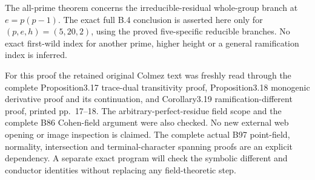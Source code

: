 \begin{remark}
\label{rem:B-RD98-scope}
The all-prime theorem concerns the irreducible-residual
whole-group branch at $e=p(p-1)$. The exact full B.4 conclusion
is asserted here only for $(p,e,h)=(5,20,2)$, using the proved
five-specific reducible branches. No exact first-wild index for
another prime, higher height or a general ramification index
is inferred.

For this proof the retained original Colmez text was freshly
read through the complete Proposition3.17 trace-dual transitivity
proof, Proposition3.18 monogenic derivative proof and its
continuation, and Corollary3.19 ramification-different proof,
printed pp.~17--18. The arbitrary-perfect-residue field scope
and the complete B86 Cohen-field argument were also checked.
No new external web opening or image inspection is claimed.
The complete actual B97 point-field, normality, intersection
and terminal-character spanning proofs are an explicit dependency.
A separate exact program will check the symbolic different and
conductor identities without replacing any field-theoretic step.
\end{remark}
